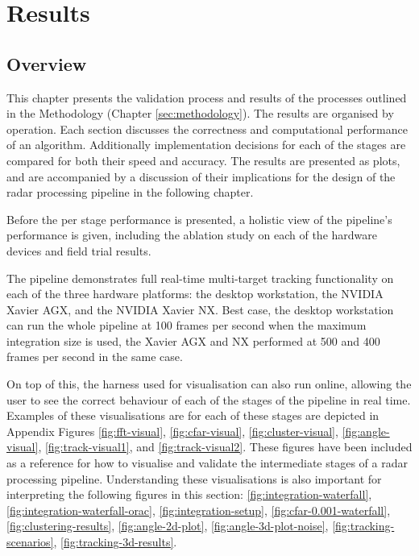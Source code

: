 \chapter{Results}
\section{Overview}
This chapter presents the validation process and results of the processes outlined in the 
Methodology (Chapter 
\ref{sec:methodology}). The results are organised by operation. Each section
discusses the correctness and computational performance of an algorithm. Additionally implementation 
decisions for each of the stages are compared for both their speed and accuracy. The results are 
presented as plots, and are accompanied by a discussion of their implications for the design 
of the radar processing pipeline in the following chapter. 

Before the per stage performance is presented, a holistic view of the pipeline's performance is
given, including the ablation study on each of the hardware devices and field trial results.  

The pipeline demonstrates full real-time multi-target tracking functionality on each of the three
hardware platforms: the desktop workstation, the NVIDIA Xavier 
AGX, and the NVIDIA Xavier NX. Best case, the desktop workstation 
can run the whole pipeline at 100 frames per second when the maximum integration size is used, 
the Xavier AGX and NX performed at 500 and 400 frames per second in the same case.  

On top of this, the harness used for visualisation can also run online, 
allowing the user to see the correct 
behaviour of each of the stages of the pipeline in real time. Examples of these visualisations are
for each of these stages are depicted in Appendix Figures  \ref{fig:fft-visual}, 
\ref{fig:cfar-visual}, \ref{fig:cluster-visual}, \ref{fig:angle-visual}, \ref{fig:track-visual1}, 
and \ref{fig:track-visual2}. These figures have been included as a reference for how to visualise
and validate the intermediate stages of a radar processing pipeline. Understanding these 
visualisations is also important for interpreting 
the following figures in this section: \ref{fig:integration-waterfall}, 
\ref{fig:integration-waterfall-orac}, \ref{fig:integration-setup}, \ref{fig:cfar-0.001-waterfall},
\ref{fig:clustering-results}, \ref{fig:angle-2d-plot}, \ref{fig:angle-3d-plot-noise},
\ref{fig:tracking-scenarios}, \ref{fig:tracking-3d-results}.

